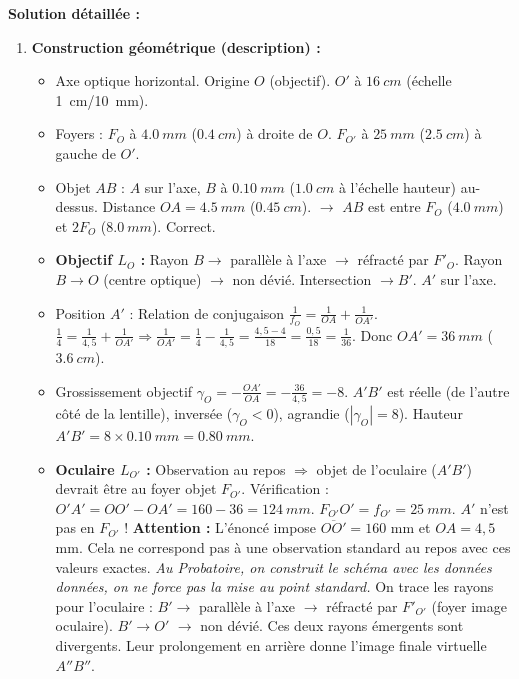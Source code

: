 \documentclass[11pt]{article}
\begin{document}
\begin{exoresolu}
\tcblower
\textbf{Solution détaillée :}
\begin{enumerate}
    \item \textbf{Construction géométrique (description) :}
    \begin{itemize}
        \item Axe optique horizontal. Origine $O$ (objectif). $O'$ à $\SI{16}{cm}$ (échelle \SI{1}{cm}/\SI{10}{mm}).
        \item Foyers : $F_O$ à $\SI{4,0}{mm}$ ($\SI{0,4}{cm}$) à droite de $O$. $F_{O'}$ à $\SI{25}{mm}$ ($\SI{2,5}{cm}$) à gauche de $O'$.
        \item Objet $AB$ : $A$ sur l'axe, $B$ à $\SI{0,10}{mm}$ ($\SI{1,0}{cm}$ à l'échelle hauteur) au-dessus. Distance $OA = \SI{4,5}{mm}$ ($\SI{0,45}{cm}$). $\rightarrow$ $AB$ est entre $F_O$ ($\SI{4,0}{mm}$) et $2F_O$ ($\SI{8,0}{mm}$). Correct.
        \item \textbf{Objectif $L_O$ :} Rayon $B \to$ parallèle à l'axe $\to$ réfracté par $F'_O$. Rayon $B \to O$ (centre optique) $\to$ non dévié. Intersection $\to B'$. $A'$ sur l'axe.
        \item Position $A'$ : Relation de conjugaison $\frac{1}{f_O} = \frac{1}{OA} + \frac{1}{OA'}$. $\frac{1}{4} = \frac{1}{4,5} + \frac{1}{OA'} \Rightarrow \frac{1}{OA'} = \frac{1}{4} - \frac{1}{4,5} = \frac{4,5-4}{18} = \frac{0,5}{18} = \frac{1}{36}$. Donc $OA' = \SI{36}{mm}$ ($\SI{3,6}{cm}$).
        \item Grossissement objectif $\gamma_O = -\frac{OA'}{OA} = -\frac{36}{4,5} = -8$. $A'B'$ est réelle (de l'autre côté de la lentille), inversée ($\gamma_O < 0$), agrandie ($|\gamma_O|=8$). Hauteur $A'B' = 8 \times \SI{0,10}{mm} = \SI{0,80}{mm}$.
        \item \textbf{Oculaire $L_{O'}$ :} Observation au repos $\Rightarrow$ objet de l'oculaire ($A'B'$) devrait être au foyer objet $F_{O'}$. Vérification : $O'A' = OO' - OA' = 160 - 36 = \SI{124}{mm}$. $F_{O'}O' = f_{O'} = \SI{25}{mm}$. $A'$ n'est pas en $F_{O'}$ ! \textbf{Attention :} L'énoncé impose $\overline{OO'}=160$ mm et $OA=4,5$ mm. Cela ne correspond pas à une observation standard au repos avec ces valeurs exactes. \emph{Au Probatoire, on construit le schéma avec les données données, on ne force pas la mise au point standard.} On trace les rayons pour l'oculaire : $B' \to$ parallèle à l'axe $\to$ réfracté par $F'_{O'}$ (foyer image oculaire). $B' \to O'$ $\to$ non dévié. Ces deux rayons émergents sont divergents. Leur prolongement en arrière donne l'image finale virtuelle $A''B''$.
    \end{itemize}

\end{enumerate}
\end{exoresolu}
\end{document}
